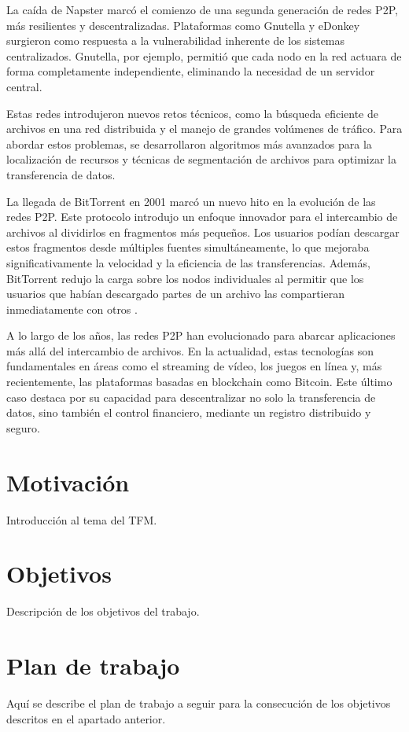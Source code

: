 La caída de Napster marcó el comienzo de una segunda generación de redes P2P, más resilientes y descentralizadas. Plataformas como Gnutella y eDonkey surgieron como respuesta a la vulnerabilidad inherente de los sistemas centralizados. Gnutella, por ejemplo, permitió que cada nodo en la red actuara de forma completamente independiente, eliminando la necesidad de un servidor central.


Estas redes introdujeron nuevos retos técnicos, como la búsqueda eficiente de archivos en una red distribuida y el manejo de grandes volúmenes de tráfico. Para abordar estos problemas, se desarrollaron algoritmos más avanzados para la localización de recursos y técnicas de segmentación de archivos para optimizar la transferencia de datos.


La llegada de BitTorrent en 2001 marcó un nuevo hito en la evolución de las redes P2P. Este protocolo introdujo un enfoque innovador para el intercambio de archivos al dividirlos en fragmentos más pequeños. Los usuarios podían descargar estos fragmentos desde múltiples fuentes simultáneamente, lo que mejoraba significativamente la velocidad y la eficiencia de las transferencias. Además, BitTorrent redujo la carga sobre los nodos individuales al permitir que los usuarios que habían descargado partes de un archivo las compartieran inmediatamente con otros \cite{cohen2003}.


A lo largo de los años, las redes P2P han evolucionado para abarcar aplicaciones más allá del intercambio de archivos. En la actualidad, estas tecnologías son fundamentales en áreas como el streaming de vídeo, los juegos en línea y, más recientemente, las plataformas basadas en blockchain como Bitcoin. Este último caso destaca por su capacidad para descentralizar no solo la transferencia de datos, sino también el control financiero, mediante un registro distribuido y seguro.



\section{Motivación}
Introducción al tema del TFM.


\section{Objetivos}
Descripción de los objetivos del trabajo.


\section{Plan de trabajo}
Aquí se describe el plan de trabajo a seguir para la consecución de los objetivos descritos en el apartado anterior.


